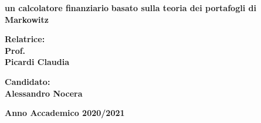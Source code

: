 \begin{titlepage}
\begin{center}
{\LARGE{\bf un calcolatore finanziario}}
\vspace{5mm}
{\LARGE{\bf basato sulla teoria dei portafogli di Markowitz}}
\end{center}
\vspace{20mm}
\par
\noindent
\begin{minipage}[t]{0.47\textwidth}
{\large{\bf Relatrice:\\
Prof.\\
Picardi Claudia}}
\end{minipage}
\begin{minipage}[t]{0.47\textwidth}\raggedleft
{\large{\bf Candidato:\\
Alessandro Nocera}}
\end{minipage}
\vspace{20mm}
\begin{center}
{\large{\bf 
Anno Accademico 2020/2021}}
\end{center}

\end{titlepage}